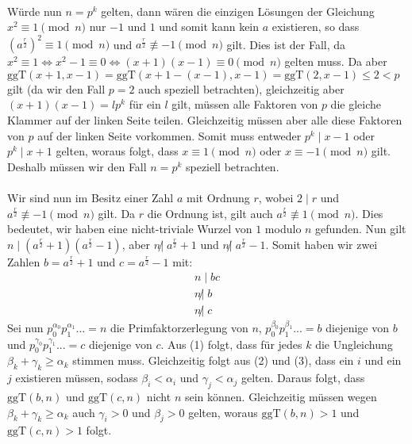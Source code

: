 \paragraph{}
Würde nun $n = p^k$ gelten, dann wären die einzigen Lösungen der Gleichung $x^2 \equiv 1 \pmod{n}$ nur $-1$ und $1$ und somit kann kein $a$ existieren, so dass $\left(a^{\frac{r}{2}}\right)^2 \equiv 1 \pmod{n}$ und $a^{\frac{r}{2}} \not\equiv -1 \pmod{n}$ gilt. Dies ist der Fall, da $x^2 \equiv 1 \Leftrightarrow x^2 - 1 \equiv 0 \Leftrightarrow (x + 1)(x - 1) \equiv 0 \pmod{n}$ gelten muss. Da aber $\text{ggT}(x + 1, x - 1) = \text{ggT}(x + 1 - (x - 1), x - 1) = \text{ggT}(2, x - 1) \leq 2 < p$ gilt (da wir den Fall $p = 2$ auch speziell betrachten), gleichzeitig aber $(x + 1)(x - 1) = lp^k$ für ein $l$ gilt, müssen alle Faktoren von $p$ die gleiche Klammer auf der linken Seite teilen. Gleichzeitig müssen aber alle diese Faktoren von $p$ auf der linken Seite vorkommen. Somit muss entweder $p^k \mid x - 1$ oder $p^k \mid x + 1$ gelten, woraus folgt, dass $x \equiv 1 \pmod{n}$ oder $x \equiv -1 \pmod{n}$ gilt. Deshalb müssen wir den Fall $n = p^k$ speziell betrachten.
\paragraph{}

Wir sind nun im Besitz einer Zahl $a$ mit Ordnung $r$, wobei $2 \mid r$ und $a^\frac{r}{2} \not\equiv -1 \pmod{n}$ gilt. Da $r$ die Ordnung ist, gilt auch $a^\frac{r}{2} \not\equiv 1 \pmod{n}$. Dies bedeutet, wir haben eine nicht-triviale Wurzel von $1$ modulo $n$ gefunden. Nun gilt $n \mid (a^\frac{r}{2} + 1)(a^\frac{r}{2} - 1)$, aber $n \not| \; a^\frac{r}{2} + 1$ und $n \not| \; a^\frac{r}{2} - 1$. Somit haben wir zwei Zahlen $b = a^\frac{r}{2} + 1$ und $c = a^\frac{r}{2} - 1$ mit:
\begin{align}
    n \mid bc \label{eq:1} \\
    n \not| \; b \label{eq:2} \\
    n \not| \; c \label{eq:3}
\end{align}    
Sei nun $p_0^{\alpha_0}p_1^{\alpha_1}... = n$ die Primfaktorzerlegung von $n$, $p_0^{\beta_0}p_1^{\beta_1}... = b$ diejenige von $b$ und $p_0^{\gamma_0}p_1^{\gamma_1}... = c$ diejenige von $c$. Aus (1) folgt, dass für jedes $k$ die Ungleichung $\beta_k + \gamma_k \geq \alpha_k$ stimmen muss. Gleichzeitig folgt aus (2) und (3), dass ein $i$ und ein $j$ existieren müssen, sodass $\beta_i < \alpha_i$ und $\gamma_j < \alpha_j$ gelten. Daraus folgt, dass $\text{ggT}(b, n)$ und $\text{ggT}(c, n)$ nicht $n$ sein können. Gleichzeitig müssen wegen $\beta_k + \gamma_k \geq \alpha_k$ auch $\gamma_i > 0$ und $\beta_j > 0$ gelten, woraus $\text{ggT}(b, n) > 1$ und $\text{ggT}(c, n) > 1$ folgt.
